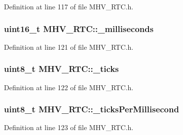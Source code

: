 \-Definition at line 117 of file \-M\-H\-V\-\_\-\-R\-T\-C.\-h.

\hypertarget{class_m_h_v___r_t_c_acd3e486b5e5ee1d8cf9d961c0fdbde57}{
\subsubsection[{\-\_\-milliseconds}]{\setlength{\rightskip}{0pt plus 5cm}uint16\-\_\-t {\bf \-M\-H\-V\-\_\-\-R\-T\-C\-::\-\_\-milliseconds}}}
\label{class_m_h_v___r_t_c_acd3e486b5e5ee1d8cf9d961c0fdbde57}


\-Definition at line 121 of file \-M\-H\-V\-\_\-\-R\-T\-C.\-h.

\hypertarget{class_m_h_v___r_t_c_ab29c30f80f7234394299476c73f36baf}{
\subsubsection[{\-\_\-ticks}]{\setlength{\rightskip}{0pt plus 5cm}uint8\-\_\-t {\bf \-M\-H\-V\-\_\-\-R\-T\-C\-::\-\_\-ticks}}}
\label{class_m_h_v___r_t_c_ab29c30f80f7234394299476c73f36baf}


\-Definition at line 122 of file \-M\-H\-V\-\_\-\-R\-T\-C.\-h.

\hypertarget{class_m_h_v___r_t_c_a48e7d03e90e78881ed8833d6e4f77b36}{
\subsubsection[{\-\_\-ticks\-Per\-Millisecond}]{\setlength{\rightskip}{0pt plus 5cm}uint8\-\_\-t {\bf \-M\-H\-V\-\_\-\-R\-T\-C\-::\-\_\-ticks\-Per\-Millisecond}}}
\label{class_m_h_v___r_t_c_a48e7d03e90e78881ed8833d6e4f77b36}


\-Definition at line 123 of file \-M\-H\-V\-\_\-\-R\-T\-C.\-h.

